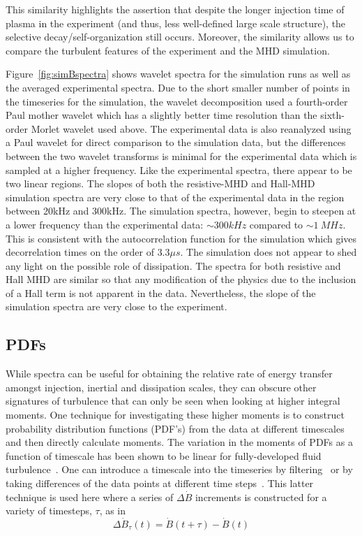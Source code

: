 \documentclass[12pt]{iopart}
\begin{document}
This similarity highlights the assertion that despite the longer injection time of plasma in the experiment (and thus, less well-defined large scale structure), the selective decay/self-organization still occurs. Moreover, the similarity allows us to compare the turbulent features of the experiment and the MHD simulation.

Figure~\ref{fig:simBspectra} shows wavelet spectra for the simulation runs as well as the averaged experimental spectra. Due to the short smaller number of points in the timeseries for the simulation, the wavelet decomposition used a fourth-order Paul mother wavelet  which has a slightly better time resolution than the sixth-order Morlet wavelet used above. The experimental data is also reanalyzed using a Paul wavelet for direct comparison to the simulation data, but the differences between the two wavelet transforms is minimal for the experimental data which is sampled at a higher frequency. Like the experimental spectra, there appear to be two linear regions. The slopes of both the resistive-MHD and Hall-MHD simulation spectra are very close to that of the experimental data in the region between 20kHz and 300kHz. The simulation spectra, however, begin to steepen at a lower frequency than the experimental data: $\sim 300kHz$ compared to $\sim 1~MHz$. This is consistent with the autocorrelation function for the simulation which gives decorrelation times on the order of $3.3 \mu s$. The simulation does not appear to shed any light on the possible role of dissipation. The spectra for both resistive and Hall MHD are similar so that any modification of the physics due to the inclusion of a Hall term is not apparent in the data. Nevertheless, the slope of the simulation spectra are very close to the experiment.

\subsection{PDFs}

While spectra can be useful for obtaining the relative rate of energy transfer amongst injection, inertial and dissipation scales, they can obscure other signatures of turbulence that can only be seen when looking at higher integral moments. One technique for investigating these higher moments is to construct probability distribution functions (PDF's) from the data at different timescales and then directly calculate moments. The variation in the moments of PDFs as a function of timescale has been shown to be linear for fully-developed fluid turbulence~\cite{frisch95}. One can introduce a timescale into the timeseries by filtering~\cite{frisch95,wan12_apj} or by taking differences of the data points at different time steps~\cite{Greco08,Greco09}. This latter technique is used here where a series of $\Delta \dot{B}$ increments is constructed for a variety of timesteps, $\tau$, as in
\begin{equation}
\Delta \dot{B}_{\tau}(t) = \dot{B}(t+\tau)-\dot{B}(t)
\label{eq:increments}
\end{equation}
\end{document}
